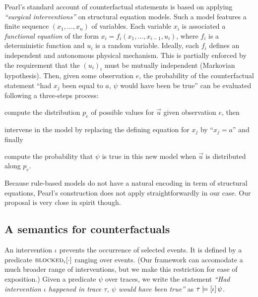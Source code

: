 Pearl's standard account of counterfactual statements is based on
applying \textit{``surgical interventions''} on structural equation
models. Such a model features a finite sequence $(x_1, \dots, x_n)$ of
variables. Each variable $x_i$ is associated a \emph{functional
  equation} of the form $x_i = f_i(x_1, \dots, x_{i-1}, u_i)$, where
$f_i$ is a deterministic function and $u_i$ is a random
variable. Ideally, each $f_i$ defines an independent and autonomous
physical mechanism. This is partially enforced by the requirement that
the $(u_i)_i$ must be mutually independent (Markovian
hypothesis). Then, given some observation $e$, the probability of the
counterfactual statement ``had $x_j$ been equal to $a$, $\psi$ would
have been be true'' can be evaluated following a three-steps process:
\begin{inparaenum}[]
\item \ItAbduction{} compute the distribution $p_e$ of possible values
  for $\vec u$ given observation $e$, then
\item \ItAction{} intervene in the model by replacing the defining
  equation for $x_j$ by ``$x_j = a$'' and finally
\item \ItPrediction{} compute the probability that $\psi$ is true in
  this new model when $\vec{u}$ is distributed along $p_e$.
\end{inparaenum}
Because rule-based models do not have a natural encoding in term of
structural equations, Pearl's construction does not apply
straightforwardly in our case. Our proposal is very close in spirit
though.



\subsection{A semantics for counterfactuals}
\label{subsec:counterfactuals-semantics}

An intervention $\iota$ prevents the occurrence of selected events. It
is defined by a predicate ${\textsc{blocked}}_{\iota}[\cdot]$ ranging over
events. (Our framework can accomodate a much broader range of
interventions, but we make this restriction for ease of exposition.)
Given a predicate $\psi$ over traces, we write the statement
\textit{``Had intervention $\iota$ happened in trace $\tau$, $\psi$
  would have been true''} as $\tau \models [\iota] \, \psi{}$.

